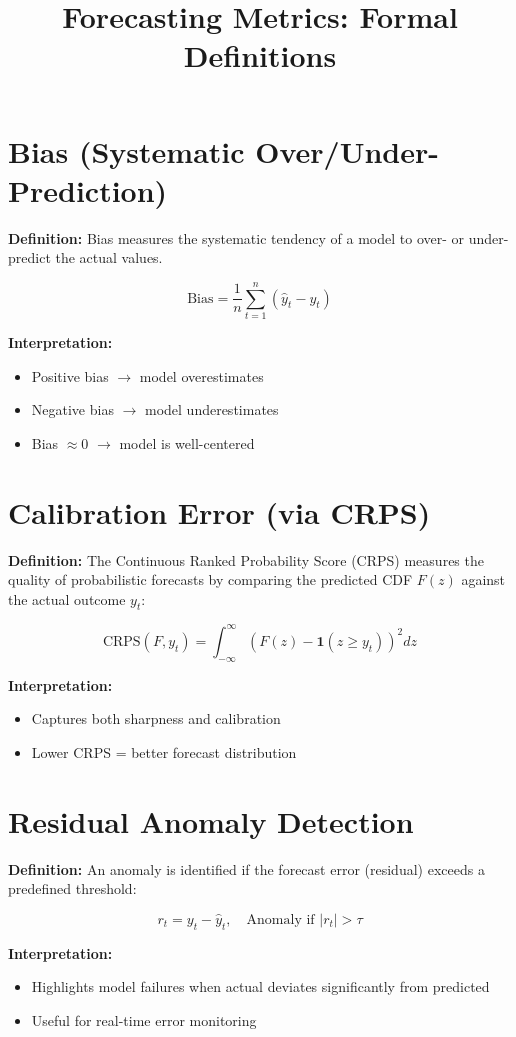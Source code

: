 \documentclass{article}
\title{Forecasting Metrics: Formal Definitions}
\author{}
\date{}
\begin{document}
\maketitle

\section{Bias (Systematic Over/Under-Prediction)}
\textbf{Definition:}
Bias measures the systematic tendency of a model to over- or under-predict the actual values.

\[
\text{Bias} = \frac{1}{n} \sum_{t=1}^{n} (\hat{y}_t - y_t)
\]

\textbf{Interpretation:}
\begin{itemize}
  \item Positive bias $\rightarrow$ model overestimates
  \item Negative bias $\rightarrow$ model underestimates
  \item Bias $\approx 0$ $\rightarrow$ model is well-centered
\end{itemize}

\section{Calibration Error (via CRPS)}
\textbf{Definition:}
The Continuous Ranked Probability Score (CRPS) measures the quality of probabilistic forecasts by comparing the predicted CDF $F(z)$ against the actual outcome $y_t$:

\[
\text{CRPS}(F, y_t) = \int_{-\infty}^{\infty} \left(F(z) - \mathbf{1}(z \geq y_t)\right)^2 dz
\]

\textbf{Interpretation:}
\begin{itemize}
  \item Captures both sharpness and calibration
  \item Lower CRPS = better forecast distribution
\end{itemize}

\section{Residual Anomaly Detection}
\textbf{Definition:}
An anomaly is identified if the forecast error (residual) exceeds a predefined threshold:

\[
r_t = y_t - \hat{y}_t, \quad \text{Anomaly if } |r_t| > \tau
\]

\textbf{Interpretation:}
\begin{itemize}
  \item Highlights model failures when actual deviates significantly from predicted
  \item Useful for real-time error monitoring
\end{itemize}
\end{document}
